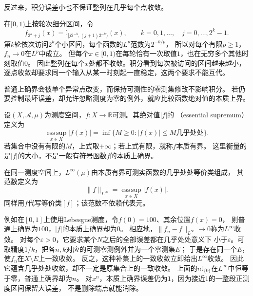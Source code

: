 反过来，积分误差小也不保证整列在几乎每个点收敛。
\begin{example}[小区间轮流扫过定义域]
\label{ex:analysis-lp-without-ae-limit}
在$[0,1)$上按轮次细分区间，令
\[
 f_{2^k+j}(x)=\mathbb I_{[j2^{-k},(j+1)2^{-k})}(x),
 \qquad k=0,1,\ldots,\quad j=0,\ldots,2^k-1.
\]
第$k$轮依次访问$2^k$个小区间，每个函数的$L^p$范数为$2^{-k/p}$，
所以对每个有限$p\geq1$，$f_n\to0$在$L^p$中成立。
但每个$x\in[0,1)$在每轮恰有一次取值$1$，也在无穷多个其他时刻取值$0$。
因此整列在每个$x$处都不收敛。积分看到每次被访问的区间越来越小，
逐点收敛却要求同一个输入从某一时刻起一直稳定，这两个要求不能互代。
\end{example}

普通上确界会被单个异常点改变，而保持可测性的零测集修改不影响积分。
若仍要控制最坏误差，却允许忽略测度为零的例外，就应比较函数绝对值的本质上界。
\begin{definition}[本质有界与绝对值的本质上界]
\label{def:analysis-essential-bound}
设$(X,\mathcal A,\mu)$为测度空间，$f:X\to\mathbb R$可测。其绝对值$|f|$的
（essential supremum）定义为
\[   \operatorname*{ess\,sup}_{x\in X}|f(x)|   =   \inf\{M\geq0:|f(x)|\leq M\text{几乎处处}\}. \]
若集合中没有有限的$M$，上式取$+\infty$；若上式有限，就称$f$本质有界。
这里衡量的是$|f|$的大小，不是一般有符号函数$f$的本质上确界。
\end{definition}

\begin{definition}
\label{def:analysis-linfty-space}
在同一测度空间上，$L^\infty(\mu)$由本质有界可测实函数的几乎处处等价类组成，
其范数定义为
\begin{equation}
  \lVert f\rVert_{L^\infty}
  =
  \operatorname*{ess\,sup}_{x\in X}|f(x)|.
\label{eq:analysis-essential-supremum-norm}
\end{equation}
同样用$f$代写等价类$[f]$；该范数不依赖代表元。
\end{definition}
例如在$[0,1]$上使用Lebesgue测度，令$f(0)=100$、其余位置$f(x)=0$，
则普通上确界为$100$，$|f|$的本质上确界却为$0$。
相应地，$\lVert f_n-f\rVert_{L^\infty}\to0$称为$L^\infty$收敛。
对每个$\varepsilon>0$，它要求某个$N$之后的全部误差都在几乎处处意义下
小于$\varepsilon$。可取精度$1/k$，把各$n,k$对应的可测零测例外并为一个零测集$E$；
于是存在同一个$E$，使$f_n$在$X\setminus E$上一致收敛。
反之，这种补集上的一致收敛立即给出$L^\infty$收敛。
因此它蕴含几乎处处收敛，却不一定是原集合上的一致收敛。
上面的$n\mathbb I_{\{0\}}$在$L^\infty$中恒等于零，普通上确界却为$n$。
对$x^n$，本质上确界误差仍为$1$，因为接近$1$的一整段正测度区间保留大误差，
不是删除端点就能消除。

